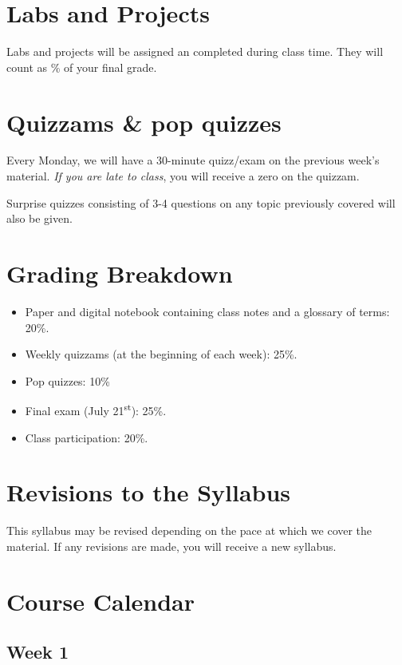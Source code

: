 \documentclass[11pt]{article}
\begin{document}
\section{Labs and Projects}

Labs and projects will be assigned an completed during class time.  They will count as \% of your final grade.


\section{Quizzams \& pop quizzes}

Every Monday, we will have a 30-minute quizz/exam on the previous week's material. \emph{If you are late to class}, you will receive a zero on the quizzam.

Surprise quizzes consisting of 3-4 questions on any topic previously covered will also be given.


\section{Grading Breakdown}

\begin{itemize}
\item Paper and digital notebook containing class notes and a glossary of terms: 20\%.
\item Weekly quizzams (at the beginning of each week): 25\%.
\item Pop quizzes: 10\%
\item Final exam (July 21\textsuperscript{st}): 25\%.
\item Class participation: 20\%.
\end{itemize}


\section{Revisions to the Syllabus}

This syllabus may be revised depending on the pace at which we cover the material. If any revisions are made, you will receive a new syllabus.


\section{Course Calendar}

\subsection*{Week 1}
\end{document}
